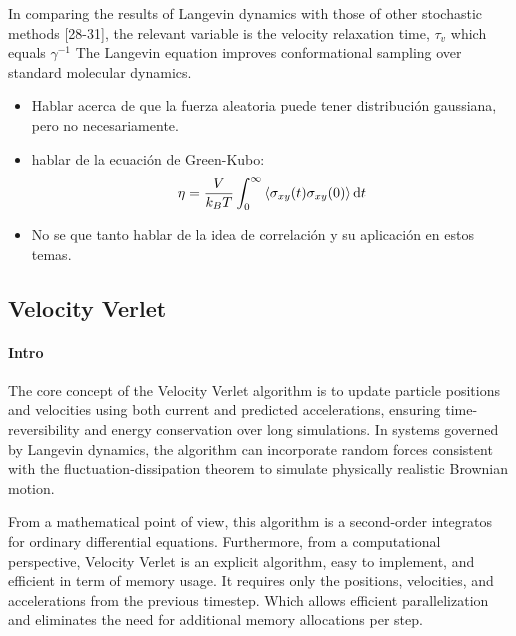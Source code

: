 In comparing the results of Langevin dynamics with those of other stochastic methods [28-31], the relevant variable is the velocity relaxation time, $\tau_{v}$ which equals $\gamma^{-1}$\citep{pastorTechniquesApplicationsLangevin1994}
The Langevin equation improves conformational sampling over standard molecular dynamics\citep{paquetMolecularDynamicsMonte2015}.

\begin{itemize}
    \item Hablar acerca de que la fuerza aleatoria puede tener distribución gaussiana, pero no necesariamente.
    \item hablar de la ecuación de Green-Kubo: \[\eta=\frac{V}{k_B T}\int_{0}^{\infty}\expval{\sigma_{xy}(t)\sigma_{xy}(0)}\mathrm{d}t\]
    \item No se que tanto hablar de la idea de correlación y su aplicación en estos temas.
\end{itemize}

\subsection{Velocity Verlet}

\paragraph{Intro} The core concept of the Velocity Verlet algorithm is to update particle positions and velocities using both current and predicted accelerations, ensuring time-reversibility and energy conservation over long simulations. 
In systems governed by Langevin dynamics, the algorithm can incorporate random forces consistent with the fluctuation-dissipation theorem to simulate physically realistic Brownian motion.

From a mathematical point of view, this algorithm is a second-order integratos for ordinary differential equations.
Furthermore, from a computational perspective, Velocity Verlet is an explicit algorithm, easy to implement, and efficient in term of memory usage.
It requires only the positions, velocities, and accelerations from the previous timestep.
Which allows efficient parallelization and eliminates the need for additional memory allocations per step.


